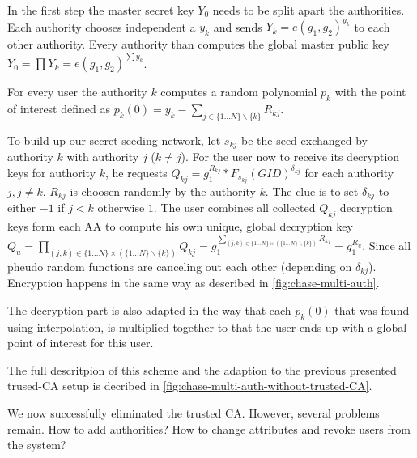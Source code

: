 \documentclass[twocolumn]{article}
\begin{document}
In the first step the master secret key $Y_0$ needs to be split apart the authorities. Each authority chooses independent a $y_k$ and sends $Y_k = e(g_1, g_2)^{y_k}$ to each other authority. Every authority than computes the global master public key $Y_0 = \prod Y_k = e(g_1, g_2)^{\sum y_k}$.

For every user the authority $k$ computes a random polynomial $p_k$ with the point of interest defined as $p_k(0) = y_k - \sum_{j \in \{1 \dots N\} \backslash \{k\}} R_{kj}$.

To build up our secret-seeding network, let $s_{kj}$ be the seed exchanged by authority $k$ with authority $j$ ($k \neq j$). For the user now to receive its decryption keys for authority $k$, he requests 
$Q_{kj} = g_1^{R_{kj}} * F_{s_{kj}}(GID)^{\delta_{kj}}$ for each authority $j, j \neq k$. $R_{kj}$ is choosen randomly by the authority $k$. The clue is to set $\delta_{kj}$ to either $-1$ if $j<k$ otherwise $1$. The user combines all collected $Q_{kj}$ decryption keys form each AA to compute his own unique, global decryption key $Q_u = \prod_{(j,k) \in \{1 \dots N\} \times (\{1 \dots N\} \backslash \{k\})} Q_{kj} = g_1^{\sum_{(j,k) \in \{1 \dots N\} \times (\{1 \dots N\} \backslash \{k\})} R_{kj}} = g_1^{R_u}$. Since all pheudo random functions are canceling out each other (depending on $\delta_{kj}$). Encryption happens in the same way as described in \ref{fig:chase-multi-auth}. 

The decryption part is also adapted in the way that each $p_k(0)$ that was found using interpolation, is multiplied together to that the user ends up with a global point of interest for this user. 

The full descritpion of this scheme and the adaption to the previous presented trused-CA setup is decribed in \ref{fig:chase-multi-auth-without-trusted-CA}.

We now successfully eliminated the trusted CA. However, several problems remain. How to add authorities? How to change attributes and revoke users from the system?
\end{document}
